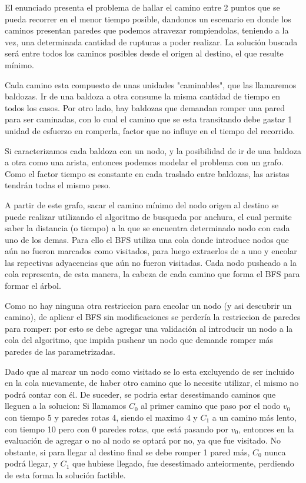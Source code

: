 El enunciado presenta el problema de hallar el camino entre 2 puntos que se pueda recorrer en el menor tiempo posible, dandonos un escenario en donde los caminos presentan paredes que podemos atravezar rompiendolas, teniendo a la vez, una determinada cantidad de rupturas a poder realizar. La solución buscada será entre todos los caminos posibles desde el origen al destino, el que resulte mínimo.

Cada camino esta compuesto de unas unidades "caminables", que las llamaremos baldozas. Ir de una baldoza a otra consume la misma cantidad de tiempo en todos los casos. Por otro lado, hay 
baldozas que demandan romper una pared para ser caminadas, con lo cual el camino que se esta transitando debe gastar 1 unidad de esfuerzo en romperla, factor que no influye en el tiempo del recorrido.

Si caracterizamos cada baldoza con un nodo, y la posibilidad de ir de una baldoza a otra como una arista, entonces podemos modelar el problema con un grafo. Como el factor tiempo es constante en cada traslado entre baldozas, las aristas tendrán todas el mismo peso.

A partir de este grafo, sacar el camino mínimo del nodo origen al destino se puede realizar utilizando el algoritmo de busqueda por anchura, el cual permite saber la distancia (o tiempo) a la que se encuentra determinado nodo con cada uno de los demas. Para ello el BFS utiliza una cola donde introduce nodos que aún no fueron marcados como visitados, para luego extraerlos de a uno y encolar las repectivas adyacencias que aún no fueron visitadas. Cada nodo pusheado a la cola representa, de esta manera, la cabeza de cada camino que forma el BFS para formar el árbol. 

Como no hay ninguna otra restriccion para encolar un nodo (y asi descubrir un camino), de aplicar el BFS sin modificaciones se perdería la restriccion de paredes para romper: por esto se debe agregar una validación al introducir un nodo a la cola del algoritmo, que impida pushear un nodo que demande romper más paredes de las parametrizadas.

Dado que al marcar un nodo como visitado se lo esta excluyendo de ser incluido en la cola nuevamente, de haber otro camino que lo necesite utilizar, el mismo no podrá contar con él. De suceder, se podria estar desestimando caminos que lleguen a la solucion: Si llamamos $C_0$ al primer camino que paso por el nodo $v_0$ con tiempo 5 y paredes rotas 4, siendo el maximo 4 y $C_1$ a un camino más lento, con tiempo 10 pero con 0 paredes rotas, que está pasando por $v_0$, entonces en la evaluación de agregar o no al nodo se optará por no, ya que fue visitado. No obstante, si para llegar al destino final se debe romper 1 pared más, $C_0$ nunca podrá llegar, y $C_1$ que hubiese llegado, fue desestimado anteiormente, perdiendo de esta forma la solución factible.

